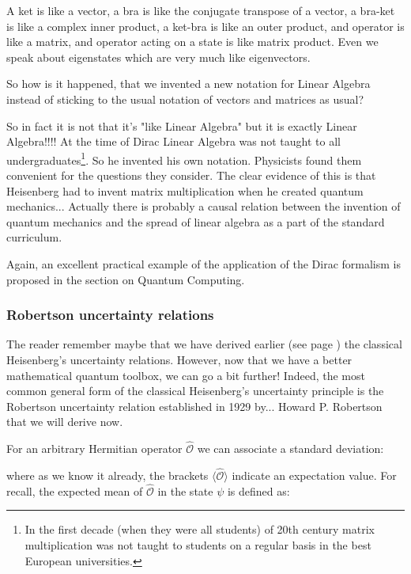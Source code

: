 	A ket is like a vector, a bra is like the conjugate transpose of a vector, a bra-ket is like a complex inner product, a ket-bra is like an outer product, and operator is like a matrix, and operator acting on a state is like matrix product. Even we speak about eigenstates which are very much like eigenvectors.

	So how is it happened, that we invented a new notation for Linear Algebra instead of sticking to the usual notation of vectors and matrices as usual?

	So in fact it is not that it's "like Linear Algebra" but it is exactly Linear Algebra!!!! At the time of Dirac Linear Algebra was not taught to all undergraduates\footnote{In the first decade (when they were all students) of 20th century matrix multiplication was not taught to students on a regular basis in the best European universities.}. So he invented his own notation. Physicists found them convenient for the questions they consider. The clear evidence of this is that Heisenberg had to invent matrix multiplication when he created quantum mechanics... Actually there is probably a causal relation between the invention of quantum mechanics and the spread of linear algebra as a part of the standard curriculum.
	
	\begin{tcolorbox}[title=Remark,colframe=black,arc=10pt]
	Again, an excellent practical example of the application of the Dirac formalism is proposed in the section on Quantum Computing.
	\end{tcolorbox}
	
	\subsubsection{Robertson uncertainty relations}\label{Robertson uncertainty relations}
	The reader remember maybe that we have derived earlier (see page \pageref{heisenberg uncertainty principle}) the classical Heisenberg's uncertainty relations. However, now that we have a better mathematical quantum toolbox, we can go a bit further! Indeed, the most common general form of the classical Heisenberg's uncertainty principle is the Robertson uncertainty relation established in 1929 by...  Howard P. Robertson that we will derive now.

	For an arbitrary Hermitian operator $\hat{\mathcal{O}}$ we can associate a standard deviation:
	
    where as we know it already, the brackets $\langle  \hat{\mathcal{O}} \rangle$  indicate an expectation value. For recall, the expected mean of  $\hat{\mathcal{O}} $ in the state $\psi$   is defined as:
	
